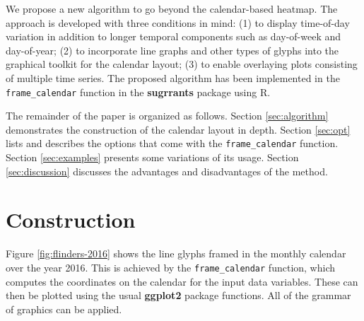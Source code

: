 \documentclass[12pt]{article}
\begin{document}
We propose a new algorithm to go beyond the calendar-based heatmap. The
approach is developed with three conditions in mind: (1) to display
time-of-day variation in addition to longer temporal components such as
day-of-week and day-of-year; (2) to incorporate line graphs and other
types of glyphs into the graphical toolkit for the calendar layout; (3)
to enable overlaying plots consisting of multiple time series. The
proposed algorithm has been implemented in the \texttt{frame\_calendar}
function in the \textbf{sugrrants} package using R.

The remainder of the paper is organized as follows. Section
\ref{sec:algorithm} demonstrates the construction of the calendar layout
in depth. Section \ref{sec:opt} lists and describes the options that
come with the \texttt{frame\_calendar} function. Section
\ref{sec:examples} presents some variations of its usage. Section
\ref{sec:discussion} discusses the advantages and disadvantages of the
method.

\hypertarget{construction}{%
\section{Construction}\label{construction}}

\label{sec:algorithm}

Figure \ref{fig:flinders-2016} shows the line glyphs framed in the
monthly calendar over the year 2016. This is achieved by the
\texttt{frame\_calendar} function, which computes the coordinates on the
calendar for the input data variables. These can then be plotted using
the usual \textbf{ggplot2} package \citep{R-ggplot2} functions. All of
the grammar of graphics \citep{wilkinson2006grammar, wickham2009ggplot2}
can be applied.
\end{document}

